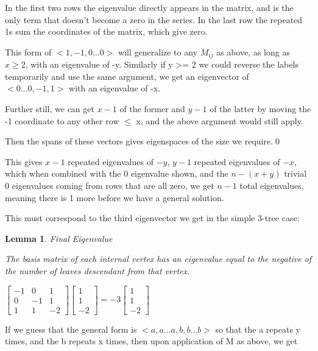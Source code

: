 \documentclass[10pt,a4paper]{report}
\newtheorem{lemma}{Lemma}
\begin{document}
In the first two rows the eigenvalue directly appears in the matrix, and is the
only term that doesn't become a zero in the series.
In the last row the repeated 1s sum the coordinates of the matrix, which give
zero.

This form of $<1, -1, 0\ldots 0>$ will generalize to any $M_{ij}$ as above, as
long as $x \geq 2$, with an eigenvalue of -y.
Similarly if y >= 2 we could reverse the labels temporarily and use the same
argument, we get an eigenvector of $<0\ldots 0, -1, 1>$ with an eigenvalue of
-x.

Further still, we can get $x-1$ of the former and $y-1$ of the latter by moving
the -1 coordinate to any other row $\leq$ x, and the above argument would still
apply.

Then the spans of these vectors gives eigenspaces of the size we require.\qed


This gives $x-1$ repeated eigenvalues of $-y$, $y-1$ repeated eigenvalues of
$-x$, which when combined with the 0 eigenvalue shown, and the $n - (x + y)$
trivial $0$ eigenvalues coming from rows that are all zero, we get $n-1$ total
eigenvalues, meaning there is 1 more before we have a general solution.

This must correspond to the third eigenvector we get in the simple 3-tree case:

\begin{lemma} Final Eigenvalue

	The basis matrix of each internal vertex has an eigenvalue equal to the
	negative of the number of leaves descendant from that vertex.
\end{lemma}

$
\left[\begin{matrix}
	-1 & 0 & 1\\
	0 & -1 & 1\\
	1 & 1 & -2
\end{matrix}\right]
\left[\begin{matrix}
	1\\
	1\\
	-2
\end{matrix}\right]
=
-3
\left[\begin{matrix}
	1\\
	1\\
	-2
\end{matrix}\right]
$

If we guess that the general form is $<a, a\ldots a, b, b\ldots b>$ so that the
a repeats y times, and the b repeats x times, then upon application of M as
above, we get
\end{document}
